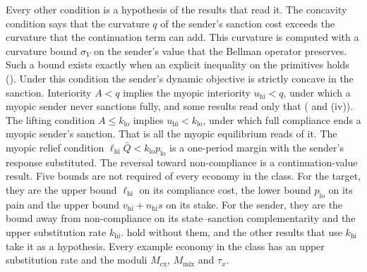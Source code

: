  Every other condition is a
hypothesis of the results that read it. The concavity condition says that the
curvature $q$ of the sender's sanction cost exceeds the curvature that the
continuation term can add. This curvature is computed with a curvature bound
$\sigma_V$ on the sender's value that the Bellman operator preserves. Such a
bound exists exactly when an explicit inequality on the primitives holds
(). Under this condition the sender's dynamic
objective is strictly concave in the sanction. Interiority $A<q$ implies the
myopic interiority $u_{\mathrm{hi}}<q$, under which a myopic sender never
sanctions fully, and some results read only that (
and (iv)). The lifting condition $A\le k_{\mathrm{lo}}$ implies
$u_{\mathrm{hi}}<k_{\mathrm{lo}}$, under which full compliance ends a myopic
sender's sanction. That is all the myopic equilibrium reads of it. The myopic
relief condition $\ell_{\mathrm{hi}}\bar Q<k_{\mathrm{lo}}p_{\mathrm{lo}}$ is a
one-period margin with the sender's response substituted. The reversal toward
non-compliance is a continuation-value result. Five bounds are not required of every
economy in the class. For the target, they are the upper bound
$\ell_{\mathrm{hi}}$ on its compliance cost, the lower bound $p_{\mathrm{lo}}$
on its pain and the upper bound $v_{\mathrm{hi}}+n_{\mathrm{hi}}s$ on its stake.
For the sender, they are the bound away from non-compliance on its state--sanction complementarity and the upper
substitution rate $k_{\mathrm{hi}}$.
hold without them, and the other results that use $k_{\mathrm{hi}}$ take it as
a hypothesis. Every example economy in the class has an upper substitution rate and the moduli
$M_{\mathrm{cx}}$, $M_{\mathrm{mix}}$ and $\tau_x$.
